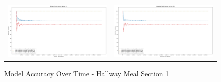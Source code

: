 \begin{figure}
  \begin{tabular}{cc}
    {\includegraphics[width = 3in]{images/results/Future_Predictions_on_hallway_M1.png}} &
    {\includegraphics[width = 3in]{images/results/Historical_Predictions_on_hallway_M1.png}} \\
  \end{tabular}
  \caption{Model Accuracy Over Time - Hallway Meal Section 1}
\end{figure}\\ \\



